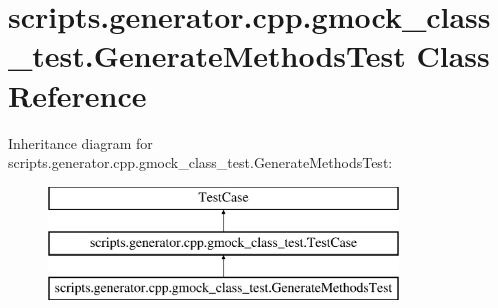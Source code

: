 \hypertarget{classscripts_1_1generator_1_1cpp_1_1gmock__class__test_1_1_generate_methods_test}{}\section{scripts.\+generator.\+cpp.\+gmock\+\_\+class\+\_\+test.\+Generate\+Methods\+Test Class Reference}
\label{classscripts_1_1generator_1_1cpp_1_1gmock__class__test_1_1_generate_methods_test}
Inheritance diagram for scripts.\+generator.\+cpp.\+gmock\+\_\+class\+\_\+test.\+Generate\+Methods\+Test\+:\begin{figure}[H]
\begin{center}
\leavevmode
\includegraphics[height=3.000000cm]{de/d43/classscripts_1_1generator_1_1cpp_1_1gmock__class__test_1_1_generate_methods_test}
\end{center}
\end{figure}
